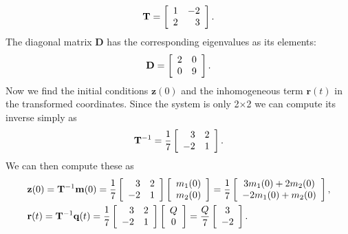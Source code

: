 \begin{align}
  \mathbf{T} = \left[ \begin{array}{r r}
   1 & -2 \\
   2 &  3 \\ \end{array} \right] . 
\end{align}
The diagonal matrix $\mathbf{D}$ has the corresponding eigenvalues as its elements:
\begin{align}
  \mathbf{D} = \left[ \begin{array}{r r}
   2 &  0 \\
   0 &  9 \\ \end{array} \right] . 
\end{align}
Now we find the initial conditions $\mathbf{z}(0)$ and the inhomogeneous term $\mathbf{r}(t)$ in the transformed coordinates. Since the system is only 2$\times$2 we can compute its inverse simply as
\begin{align}
  \mathbf{T}^{-1} = \frac{1}{7} \left[ \begin{array}{r r}
   3 &  2 \\
  -2 &  1 \\ \end{array} \right] . 
\end{align}
We can then compute these as
\begin{align}
  &\mathbf{z}(0) = \mathbf{T}^{-1} \mathbf{m}(0) 
  = \frac{1}{7} \left[ \begin{array}{r r}
   3 &  2 \\
  -2 &  1 \\ \end{array} \right]
  \left[ \begin{array}{c} m_1(0) \\ m_2(0) \\ \end{array} \right]
  = \frac{1}{7} \left[ \begin{array}{c} 3 m_1(0) + 2 m_2(0) \\ -2 m_1(0) + m_2(0) \\ \end{array} \right] , \\
  &\mathbf{r}(t) = \mathbf{T}^{-1} \mathbf{q}(t) 
  = \frac{1}{7} \left[ \begin{array}{r r}
   3 &  2 \\
  -2 &  1 \\ \end{array} \right]
  \left[ \begin{array}{c} Q \\ 0 \\ \end{array} \right]
  = \frac{Q}{7} \left[ \begin{array}{c} 3 \\ -2 \\ \end{array} \right] .
\end{align}
